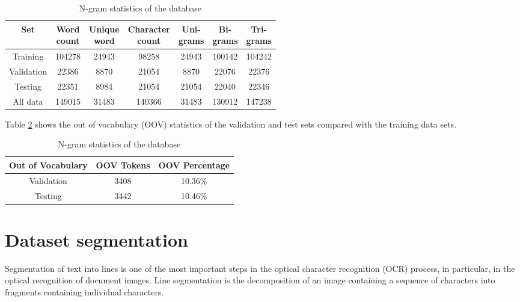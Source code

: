 \documentclass[preprint,12pt]{elsarticle}
\begin{document}
\begin{table}[h!]
    \centering
    \caption{N-gram statistics of the database}
    \label{tab:table_staticstic}
    \begin{tabular}{|c|c|c|c|c|c|c|}
   \hline
         Set &  \makecell{Word \\ count}   &  \makecell{Unique \\ word}    & \makecell{Character \\ count}     & \makecell{Uni-\\grams} & \makecell{Bi-\\grams} & \makecell{Tri-\\grams} \\ \hline
         Training   & 104278 &  24943 &   98258  & 24943 &   100142  &  104242      \\ \hline
         Validation & 22386  &  8870  &   21054  & 8870  &   22076   &  22376    \\ \hline
         Testing    & 22351  &  8984  &   21054  & 21054 &   22040   &  22346     \\ \hline
         All data   & 149015 & 31483  &  140366  & 31483 &   130912  &   147238  \\ \hline
    \end{tabular}
\end{table}

Table \ref{tab:oov} shows the out of vocabulary (OOV) statistics of the validation and test sets compared with the training data sets.
\begin{table}[h!]
    \centering
    \caption{N-gram statistics of the database}
    \label{tab:oov}
    \begin{tabular}{|c|c|c|}
   \hline
         Out of Vocabulary &  OOV Tokens & OOV Percentage \\ \hline
         Validation &  3408 & 10.36\% \\ \hline
         Testing &     3442 & 10.46\% \\ \hline
    \end{tabular}
\end{table}

\section{Dataset segmentation}
\label{section:segmentation}
Segmentation of text into lines is one of the most important steps in the optical character recognition (OCR) process, in particular, in the optical recognition of document images. Line segmentation is the decomposition of an image containing a sequence of characters into fragments containing individual characters.
\end{document}
